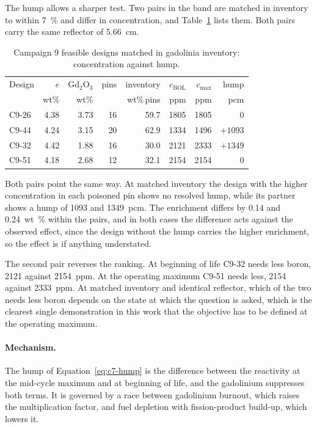 The hump allows a sharper test. Two pairs in the band are matched in
inventory to within \SI{7}{\%} and differ in concentration, and
Table~\ref{tab:c9-pairs} lists them. Both pairs carry the same reflector of
\SI{5.66}{cm}.

\begin{table}[htbp]
  \centering
  \caption{Campaign 9 feasible designs matched in gadolinia inventory: concentration against hump.}
  \label{tab:c9-pairs}
  \small
  \begin{tabular}{@{}lrrrrrrr@{}}
    \toprule
    Design & $e$ & Gd$_2$O$_3$ & pins & inventory & $c_\mathrm{BOL}$ &
    $c_\mathrm{max}$ & hump \\
     & wt\% & wt\% & & wt\%\,pins & ppm & ppm & pcm \\
    \midrule
    C9-26 & 4.38 & 3.73 & 16 & 59.7 & 1805 & 1805 & 0 \\
    C9-44 & 4.24 & 3.15 & 20 & 62.9 & 1334 & 1496 & $+1093$ \\
    \addlinespace
    C9-32 & 4.42 & 1.88 & 16 & 30.0 & 2121 & 2333 & $+1349$ \\
    C9-51 & 4.18 & 2.68 & 12 & 32.1 & 2154 & 2154 & 0 \\
    \bottomrule
  \end{tabular}
\end{table}

Both pairs point the same way. At matched inventory the design with the
higher concentration in each poisoned pin shows no resolved hump, while its
partner shows a hump of 1093 and \SI{1349}{pcm}. The enrichment differs by
0.14 and \SI{0.24}{wt\%} within the pairs, and in both cases the difference
acts against the observed effect, since the design without the hump carries
the higher enrichment, so the effect is if anything understated.

The second pair reverses the ranking. At beginning of life C9-32 needs less
boron, 2121 against \SI{2154}{ppm}. At the operating maximum C9-51 needs
less, 2154 against \SI{2333}{ppm}. At matched inventory and identical
reflector, which of the two needs less boron depends on the state at which
the question is asked, which is the clearest single demonstration in this
work that the objective has to be defined at the operating maximum.

\paragraph{Mechanism.}
The hump of Equation~\eqref{eq:c7-hump} is the difference between the
reactivity at the mid-cycle maximum and at beginning of life, and the
gadolinium suppresses both terms. It is governed by a race between
gadolinium burnout, which raises the multiplication factor, and fuel
depletion with fission-product build-up, which lowers it.

